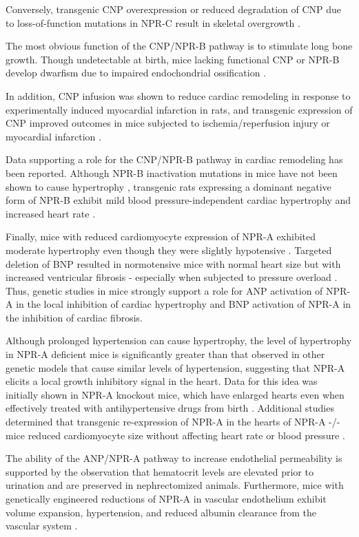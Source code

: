 \documentclass[14pt,a4paper,onecolumn]{extarticle}
\begin{document}
Conversely, transgenic CNP overexpression or reduced degradation of CNP due to loss-of-function mutations in NPR-C result in skeletal overgrowth \citep{Yasoda2004}. %

The most obvious function of the CNP/NPR-B pathway is to stimulate long bone growth. Though undetectable at birth, mice lacking functional CNP or NPR-B develop dwarfism due to impaired endochondrial ossification \citep{Tsuji2005}. %

In addition, CNP infusion was shown to reduce cardiac remodeling in response to experimentally induced myocardial infarction in rats, and transgenic expression of CNP improved outcomes in mice subjected to ischemia/reperfusion injury or myocardial infarction \citep{Wang2007}. %

Data supporting a role for the CNP/NPR-B pathway in cardiac remodeling has been reported. Although NPR-B inactivation mutations in mice have not been shown to cause hypertrophy \citep{Tamura2004} \citep{Tsuji2005}, transgenic rats expressing a dominant negative form of NPR-B exhibit mild blood pressure-independent cardiac hypertrophy and increased heart rate \citep{Langenickel2006}. %

Finally, mice with reduced cardiomyocyte expression of NPR-A exhibited moderate hypertrophy even though they were slightly hypotensive \citep{Holtwick2003} \citep{Patel2005}. Targeted deletion of BNP resulted in normotensive mice with normal heart size but with increased ventricular fibrosis - especially when subjected to pressure overload \citep{Tamura2000}. Thus, genetic studies in mice strongly support a role for ANP activation of NPR-A in the local inhibition of cardiac hypertrophy and BNP activation of NPR-A in the inhibition of cardiac fibrosis. %

Although prolonged hypertension can cause hypertrophy, the level of hypertrophy in NPR-A deficient mice is significantly greater than that observed in other genetic models that cause similar levels of hypertension, suggesting that NPR-A elicits a local growth inhibitory signal in the heart. Data for this idea was initially shown in NPR-A knockout mice, which have enlarged hearts even when effectively treated with antihypertensive drugs from birth \citep{Knowles2001}. Additional studies determined that transgenic re-expression of NPR-A in the hearts of NPR-A -/- mice reduced cardiomyocyte size without affecting heart rate or blood pressure \citep{Kishimoto2001}. %

The ability of the ANP/NPR-A pathway to increase  endothelial permeability is supported by the observation that hematocrit levels are elevated prior to urination and are preserved in nephrectomized animals.  Furthermore, mice with genetically engineered reductions of NPR-A in vascular endothelium exhibit volume expansion, hypertension, and reduced albumin clearance from the vascular system \citep{Sabrane2005}. %
\end{document}
